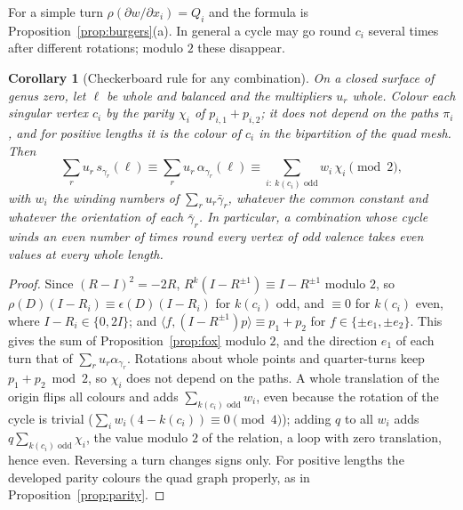\documentclass[11pt,a4paper]{article}
\newtheorem{corollary}{Corollary}
\newcommand{\shift}{s}
\newcommand{\lean}[1]{\texttt{\detokenize{#1}}}
\newenvironment{evidence}[3][]{}{}
\begin{document}
For a simple turn $\rho(\partial w/\partial x_i) = Q_i$ and the formula is
Proposition~\ref{prop:burgers}(a). In general a cycle may go round $c_i$
several times after different rotations; modulo $2$ these disappear.

\begin{evidence}{core}{\lean{checkerboard_word}, \lean{checkerboard_combination}; assumed: as in the formula above}
\begin{corollary}[Checkerboard rule for any combination]\label{cor:checker}
On a closed surface of genus zero, let $\ell$ be whole and balanced and the
multipliers $u_r$ whole. Colour each singular vertex $c_i$ by the parity
$\chi_i$ of $p_{i,1} + p_{i,2}$; it does not depend on the paths $\pi_i$, and
for positive lengths it is the colour of $c_i$ in the bipartition of the quad
mesh. Then
\[
  \sum_r u_r\, \shift_{\gamma_r}(\ell) \equiv \sum_r u_r\, \alpha_{\gamma_r}(\ell)
  \equiv \sum_{i:\ k(c_i) \text{ odd}} w_i\, \chi_i \pmod 2 ,
\]
with $w_i$ the winding numbers of $\sum_r u_r \bar\gamma_r$, whatever the
common constant and whatever the orientation of each $\bar\gamma_r$. In
particular, a combination whose cycle winds an even number of times round every
vertex of odd valence takes even values at every whole length.
\end{corollary}
\end{evidence}

\begin{proof}
Since $(R - I)^2 = -2R$, $R^k(I - R^{\pm1}) \equiv I - R^{\pm1}$ modulo $2$, so
$\rho(D)(I - R_i) \equiv \epsilon(D)(I - R_i)$ for $k(c_i)$ odd, and $\equiv 0$
for $k(c_i)$ even, where $I - R_i \in \{0, 2I\}$; and $\langle f, (I -
R^{\pm1})p\rangle \equiv p_1 + p_2$ for $f \in \{\pm e_1, \pm e_2\}$. This
gives the sum of Proposition~\ref{prop:fox} modulo $2$, and the direction
$e_1$ of each turn that of $\sum_r u_r \alpha_{\gamma_r}$. Rotations about
whole points and quarter-turns keep $p_1 + p_2 \bmod 2$, so $\chi_i$ does not
depend on the paths. A whole translation of the origin flips all colours and
adds $\sum_{k(c_i)\text{ odd}} w_i$, even because the rotation of the cycle is
trivial ($\sum_i w_i (4 - k(c_i)) \equiv 0 \pmod 4$); adding $q$ to all $w_i$
adds $q \sum_{k(c_i)\text{ odd}} \chi_i$, the value modulo $2$ of the
relation, a loop with zero translation, hence even. Reversing a turn changes
signs only. For positive lengths the developed parity colours the quad graph
properly, as in Proposition~\ref{prop:parity}.
\end{proof}
\end{document}
